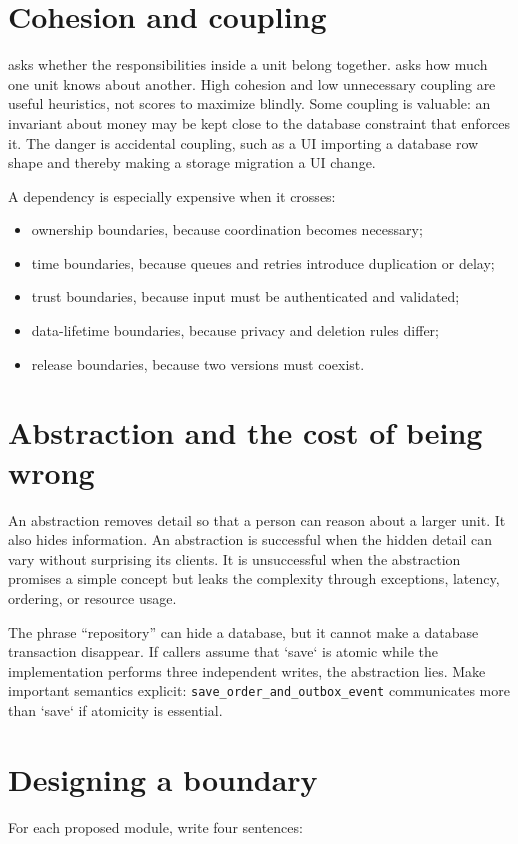 \section{Cohesion and coupling}
 asks whether the responsibilities inside a unit belong together.
 asks how much one unit knows about another. High cohesion and
low unnecessary coupling are useful heuristics, not scores to maximize blindly.
Some coupling is valuable: an invariant about money may be kept close to the
database constraint that enforces it. The danger is accidental coupling, such as
a UI importing a database row shape and thereby making a storage migration a UI
change.

A dependency is especially expensive when it crosses:

\begin{itemize}
  \item ownership boundaries, because coordination becomes necessary;
  \item time boundaries, because queues and retries introduce duplication or delay;
  \item trust boundaries, because input must be authenticated and validated;
  \item data-lifetime boundaries, because privacy and deletion rules differ;
  \item release boundaries, because two versions must coexist.
\end{itemize}

\section{Abstraction and the cost of being wrong}
An abstraction removes detail so that a person can reason about a larger unit.
It also hides information. An abstraction is successful when the hidden detail
can vary without surprising its clients. It is unsuccessful when the abstraction
promises a simple concept but leaks the complexity through exceptions, latency,
ordering, or resource usage.

The phrase “repository” can hide a database, but it cannot make a database
transaction disappear. If callers assume that `save` is atomic while the
implementation performs three independent writes, the abstraction lies. Make
important semantics explicit: \texttt{save\_order\_and\_outbox\_event} communicates more
than `save` if atomicity is essential.

\section{Designing a boundary}
For each proposed module, write four sentences:

